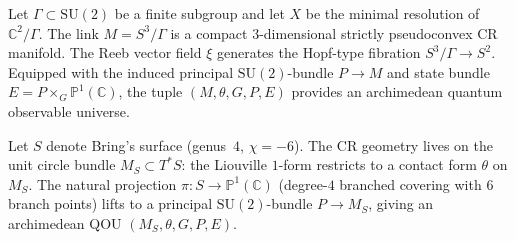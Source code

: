 \begin{example}
\label{ex:ale}
Let $\Gamma \subset \mathrm{SU}(2)$ be a finite subgroup and let $X$ be the
minimal resolution of $\mathbb{C}^2 / \Gamma$.  The link
$M = S^3 / \Gamma$ is a compact $3$-dimensional strictly pseudoconvex
CR manifold.  The Reeb vector field $\xi$ generates the Hopf-type
fibration $S^3/\Gamma \to S^2$.  Equipped with the induced principal
$\mathrm{SU}(2)$-bundle $P \to M$ and state bundle
$E = P \times_G \mathbb{P}^1(\mathbb{C})$, the tuple
$(M, \theta, G, P, E)$ provides an archimedean quantum observable universe.
\end{example}

\begin{example}
\label{ex:brings-surface}
Let $S$ denote Bring's surface (genus~$4$, $\chi = -6$).  The CR geometry
lives on the unit circle bundle $M_S \subset T^*S$: the Liouville
$1$-form restricts to a contact form $\theta$ on $M_S$.  The natural
projection $\pi \colon S \to \mathbb{P}^1(\mathbb{C})$ (degree-$4$
branched covering with $6$ branch points) lifts to a principal
$\mathrm{SU}(2)$-bundle $P \to M_S$, giving an archimedean QOU
$(M_S, \theta, G, P, E)$.
\end{example}

